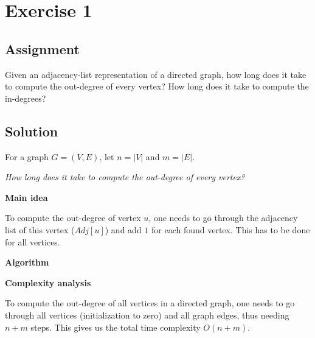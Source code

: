 
\section*{Exercise 1}
\label{sec:Ex1}

\subsection*{Assignment}

Given an adjacency-list representation of a directed graph, how long does it
take to compute the out-degree of every vertex? How long does it take to
compute the in-degrees?

\subsection*{Solution}

For a graph $G = (V, E)$, let $n = |V|$ and $m = |E|$.

\textit{How long does it take to compute the out-degree of every vertex?}

\textbf{Main idea}

To compute the out-degree of vertex $u$, one needs to go through the adjacency
list of this vertex ($Adj[u]$) and add $1$ for each found vertex. This has to
be done for all vertices.

\textbf{Algorithm}

\begin{algorithm}[H]

\end{algorithm}

\textbf{Complexity analysis}

To compute the out-degree of all vertices in a directed graph, one needs to go
through all vertices (initialization to zero) and all graph edges, thus needing
$n + m$ steps. This gives us the total time complexity $O(n + m)$.

